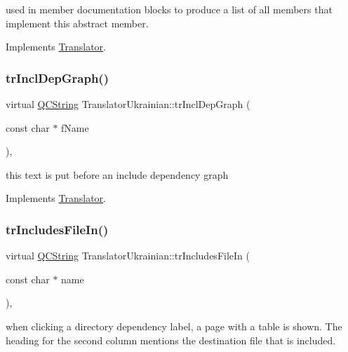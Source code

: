 used in member documentation blocks to produce a list of all members that implement this abstract member. 

Implements \mbox{\hyperlink{class_translator}{Translator}}.

\mbox{\label{class_translator_ukrainian_abe94b75a7d855a01e2f2740f8b2eb9ba}} 
\subsubsection{\texorpdfstring{trInclDepGraph()}{trInclDepGraph()}}
{\footnotesize\ttfamily virtual \mbox{\hyperlink{class_q_c_string}{Q\+C\+String}} Translator\+Ukrainian\+::tr\+Incl\+Dep\+Graph (\begin{DoxyParamCaption}\item[{const char $\ast$}]{f\+Name }\end{DoxyParamCaption})\hspace{0.3cm}{\ttfamily [inline]}, {\ttfamily [virtual]}}

this text is put before an include dependency graph 

Implements \mbox{\hyperlink{class_translator}{Translator}}.

\mbox{\label{class_translator_ukrainian_a9e28f6f81d200f38ae8831017ee4ca5f}} 
\subsubsection{\texorpdfstring{trIncludesFileIn()}{trIncludesFileIn()}}
{\footnotesize\ttfamily virtual \mbox{\hyperlink{class_q_c_string}{Q\+C\+String}} Translator\+Ukrainian\+::tr\+Includes\+File\+In (\begin{DoxyParamCaption}\item[{const char $\ast$}]{name }\end{DoxyParamCaption})\hspace{0.3cm}{\ttfamily [inline]}, {\ttfamily [virtual]}}

when clicking a directory dependency label, a page with a table is shown. The heading for the second column mentions the destination file that is included. 

